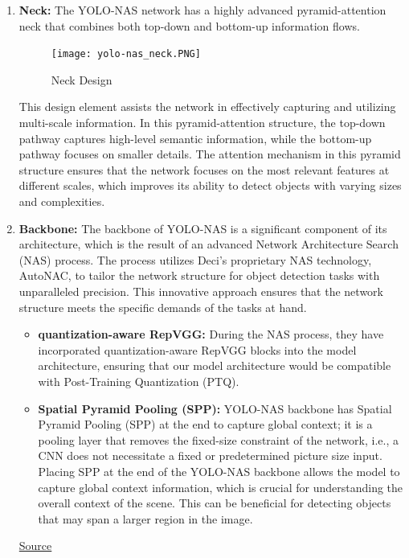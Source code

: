 \begin{enumerate}
    \item \textbf{Neck: } The YOLO-NAS network has a highly advanced pyramid-attention neck that combines both top-down and bottom-up information flows. 
    \begin{figure}[H]
        \centering
        \texttt{[image: yolo-nas\_neck.PNG]}
        \caption{Neck Design}
        \label{fig:Neck}
    \end{figure}
    This design element assists the network in effectively capturing and utilizing multi-scale information. In this pyramid-attention structure, the top-down pathway captures high-level semantic information, while the bottom-up pathway focuses on smaller details. The attention mechanism in this pyramid structure ensures that the network focuses on the most relevant features at different scales, which improves its ability to detect objects with varying sizes and complexities. 
    \item \textbf{Backbone: } 
The backbone of YOLO-NAS is a significant component of its architecture, which is the result of an advanced Network Architecture Search (NAS) process. The process utilizes Deci's proprietary NAS technology, AutoNAC, to tailor the network structure for object detection tasks with unparalleled precision. This innovative approach ensures that the network structure meets the specific demands of the tasks at hand.
\begin{itemize}
    \item \textbf{quantization-aware RepVGG: } During the NAS process, they have incorporated quantization-aware RepVGG blocks into the model architecture, ensuring that our model architecture would be compatible with Post-Training Quantization (PTQ).\\
    \item \textbf{Spatial Pyramid Pooling (SPP): } YOLO-NAS backbone has Spatial Pyramid Pooling (SPP)  at the end to capture global context; it is a pooling layer that removes the fixed-size constraint of the network, i.e., a CNN does not necessitate a fixed or predetermined picture size input. Placing SPP at the end of the YOLO-NAS backbone allows the model to capture global context information, which is crucial for understanding the overall context of the scene. This can be beneficial for detecting objects that may span a larger region in the image.\cite{YOLO-NAS}
\end{itemize}

\href{https://deci.ai/blog/yolo-nas-object-detection-foundation-model/}{Source}


\end{enumerate}
